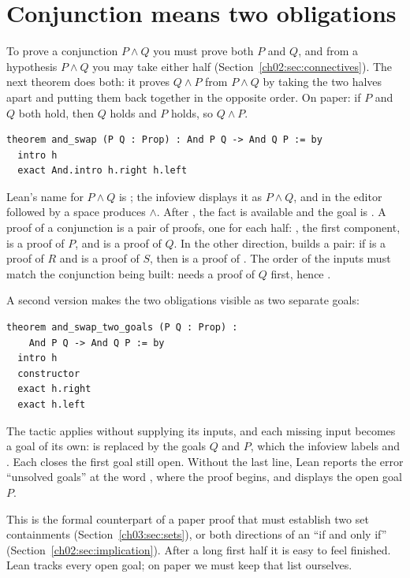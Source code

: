 \section{Conjunction means two obligations}\label{ch15:sec:conjunction}
To prove a conjunction $P\land Q$ you must prove both $P$ and $Q$, and from a hypothesis $P\land Q$ you may take either half (Section~\ref{ch02:sec:connectives}). The next theorem does both: it proves $Q\land P$ from $P\land Q$ by taking the two halves apart and putting them back together in the opposite order. On paper: if $P$ and $Q$ both hold, then $Q$ holds and $P$ holds, so $Q\land P$.
\par\noindent\begin{minipage}{\linewidth}
\begin{lstlisting}
theorem and_swap (P Q : Prop) : And P Q -> And Q P := by
  intro h
  exact And.intro h.right h.left
\end{lstlisting}
\end{minipage}\par

Lean's name for $P\land Q$ is ; the infoview displays it as $P\land Q$, and in the editor  followed by a space produces $\land$. After , the fact  is available and the goal is . A proof of a conjunction is a pair of proofs, one for each half: , the first component, is a proof of $P$, and  is a proof of $Q$. In the other direction,  builds a pair: if  is a proof of $R$ and  is a proof of $S$, then  is a proof of . The order of the inputs must match the conjunction being built:  needs a proof of $Q$ first, hence .

A second version makes the two obligations visible as two separate goals:
\par\noindent\begin{minipage}{\linewidth}
\begin{lstlisting}
theorem and_swap_two_goals (P Q : Prop) :
    And P Q -> And Q P := by
  intro h
  constructor
  exact h.right
  exact h.left
\end{lstlisting}
\end{minipage}\par
The tactic  applies  without supplying its inputs, and each missing input becomes a goal of its own:  is replaced by the goals $Q$ and $P$, which the infoview labels  and . Each  closes the first goal still open. Without the last line, Lean reports the error ``unsolved goals'' at the word , where the proof begins, and displays the open goal $P$.

This is the formal counterpart of a paper proof that must establish two set containments (Section~\ref{ch03:sec:sets}), or both directions of an ``if and only if'' (Section~\ref{ch02:sec:implication}). After a long first half it is easy to feel finished. Lean tracks every open goal; on paper we must keep that list ourselves.
